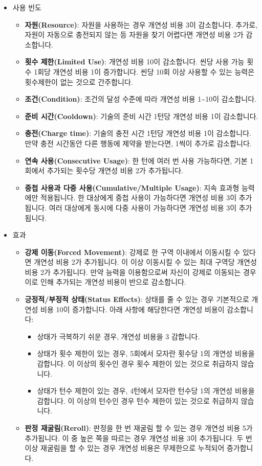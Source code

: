 \documentclass{report}
\begin{document}
\begin{itemize}
		\item 사용 빈도
		\begin{itemize}
			\item \textbf{자원(Resource)}: 자원을 사용하는 경우 개연성 비용 3이 감소합니다. 추가로, 자원이 자동으로 충전되지 않는 등 자원을 찾기 어렵다면 개연성 비용 2가 감소합니다.
			\item \textbf{횟수 제한(Limited Use)}: 개연성 비용 10이 감소합니다. 씬당 사용 가능 횟수 1회당 개연성 비용 1이 증가합니다. 씬당 10회 이상 사용할 수 있는 능력은 횟수제한이 없는 것으로 간주합니다.
			\item \textbf{조건(Condition)}: 조건의 달성 수준에 따라 개연성 비용 1\textasciitilde10이 감소합니다.
			\item \textbf{준비 시간(Cooldown)}: 기술의 준비 시간 1턴당 개연성 비용 1이 감소합니다.
			\item \textbf{충전(Charge time)}: 기술의 충전 시간 1턴당 개연성 비용 1이 감소합니다. 만약 충전 시간동안 다른 행동에 제약을 받는다면, 1씩이 추가로 감소합니다.
			\item \textbf{연속 사용(Consecutive Usage)}: 한 턴에 여러 번 사용 가능하다면, 기본 1회에서 추가되는 횟수당 개연성 비용 2가 추가됩니다.
			\item \textbf{중첩 사용과 다중 사용(Cumulative/Multiple Usage)}: 지속 효과형 능력에만 적용됩니다. 한 대상에게 중첩 사용이 가능하다면 개연성 비용 3이 추가됩니다. 여러 대상에게 동시에 다중 사용이 가능하다면 개연성 비용 3이 추가됩니다.
		\end{itemize}
		
		\item 효과
		\begin{itemize}
			\item \textbf{강제 이동(Forced Movement)}: 강제로 한 구역 이내에서 이동시킬 수 있다면 개연성 비용 2가 추가됩니다. 이 이상 이동시킬 수 있는 최대 구역당 개연성 비용 2가 추가됩니다. 만약 능력을 이용함으로써 자신이 강제로 이동되는 경우 이로 인해 추가되는 개연성 비용이 반으로 감소합니다.
			\item \textbf{긍정적/부정적 상태(Status Effects)}: 상태를 줄 수 있는 경우 기본적으로 개연성 비용 10이 증가합니다. 아래 사항에 해당한다면 개연성 비용이 감소합니다:
			\begin{itemize}
				\item 상태가 극복하기 쉬운 경우, 개연성 비용을 3 감합니다.
				\item 상태가 횟수 제한이 있는 경우, 5회에서 모자란 횟수당 1의 개연성 비용을 감합니다. 이 이상의 횟수인 경우 횟수 제한이 있는 것으로 취급하지 않습니다.
				\item 상태가 턴수 제한이 있는 경우, 4턴에서 모자란 턴수당 1의 개연성 비용을 감합니다. 이 이상의 턴수인 경우 턴수 제한이 있는 것으로 취급하지 않습니다.
			\end{itemize}
			\item \textbf{판정 재굴림(Reroll)}: 판정을 한 번 재굴림 할 수 있는 경우 개연성 비용 5가 추가됩니다. 이 중 높은 쪽을 따르는 경우 개연성 비용 3이 추가됩니다. 두 번 이상 재굴림을 할 수 있는 경우 개연성 비용은 무제한으로 누적되어 증가합니다.
		\end{itemize}
		

\end{itemize}
\end{document}
